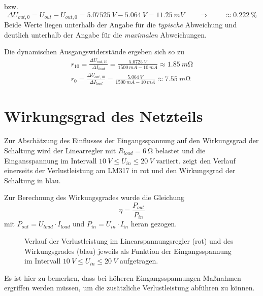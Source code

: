 		bzw.
		\begin{equation}
			\Delta U_{out,0} = U_{out} - U_{out,0} = \SI{5,07525}{V} - \SI{5,064}{V} = \SI{11,25}{mV} \qquad \Rightarrow \qquad \approx \SI{0,222}{\percent}
		\end{equation}
		Beide Werte liegen unterhalb der Angabe für die \textit{typische} Abweichung und deutlich unterhalb der Angabe für die \textit{maximalen} Abweichungen.\par\medskip
		Die dynamischen Ausgangswiderstände ergeben sich so zu
		\begin{align}
			r_{10} = \frac{\Delta U_{out,10}}{\Delta I_{load}} = \frac{\SI{5,0725}{V}}{\SI{1500}{mA} - \SI{10}{mA}} \approx \SI{1,85}{m\ohm} \nonumber \\
			r_{0} = \frac{\Delta U_{out,10}}{\Delta I_{load}} = \frac{\SI{5,064}{V}}{\SI{1500}{mA} - \SI{10}{mA}} \approx \SI{7,55}{m\ohm}
		\end{align}
		\newpage
	\section{Wirkungsgrad des Netzteils}
		Zur Abschätzung des Einflusses der Eingangsspannung auf den Wirkungsgrad der Schaltung wird der Linearregler mit \(R_{load} = \SI{6}{\ohm}\) belastet und
		die Eingansspannung im Intervall \(\SI{10}{V} \leq U_{in} \leq \SI{20}{V}\) variiert.  zeigt den Verlauf einerseits der Verlustleistung
		am LM317 in rot und den Wirkungsgrad der Schaltung in blau.\par
		Zur Berechnung des Wirkungsgrades wurde die Gleichung
		\begin{equation}
			\eta = \frac{P_{out}}{P_{in}}
		\end{equation}
		mit \(P_{out} = U_{loud} \cdot I_{load}\) und \(P_{in} = U_{in} \cdot I_{in}\) heran gezogen.
		\begin{figure}[h]
			\centering
			
			\caption[Verlauf der Verlustleistung und des Wirkungsgrades jeweils als Funktion der Eingangsspannung]{Verlauf der Verlustleistung im Linearspannungsregler (rot) und des
			Wirkungsgrades (blau) jeweils als Funktion der Eingangsspannung im Intervall \(\SI{10}{V} \leq U_{in} \leq \SI{20}{V}\) aufgetragen.}
			\label{fig:efficiency}
		\end{figure}
		Es ist hier zu bemerken, dass bei höheren Eingangsspannungen Maßnahmen ergriffen werden müssen, um die zusätzliche Verlustleistung abführen zu können.